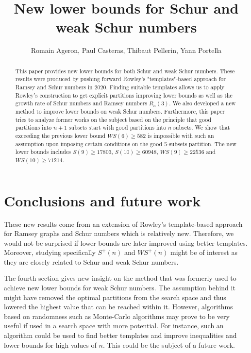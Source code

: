 \documentclass{article}
\title{New lower bounds for Schur and weak Schur numbers}
\author{Romain Ageron, Paul Casteras, Thibaut Pellerin, Yann Portella}
\newtheorem{computational theorem}{Computational Theorem}[section]
\begin{document}
\maketitle

\begin{abstract}

This paper provides new lower bounds for both Schur and weak Schur numbers. These results were produced by pushing forward
Rowley's "templates"-based approach for Ramsey and Schur numbers in 2020. Finding suitable templates allows us to apply Rowley's construction
to get explicit partitions improving lower bounds as well as the growth rate of Schur numbers and Ramsey numbers \(R_n(3)\). 
We also developed a new method to improve lower bounds on weak Schur numbers. Furthermore, this paper tries to analyze former 
works on the subject based on the principle that good partitions into \(n+1\) subsets start with good partitions 
into \(n\) subsets. We show that exceeding the previous lower bound \(WS(6) \geqslant 582\) is impossible with such an assumption upon 
imposing certain conditions on the good 5-subsets partition. The new lower bounds includes \(S(9) \geqslant 17803\), \(S(10) \geqslant 60948\), 
\(WS(9) \geqslant 22536 \) and \(WS(10) \geqslant 71214 \).

\end{abstract}










\section{Conclusions and future work}

\par
These new results come from an extension of Rowley's template-based approach for Ramsey graphs and Schur numbers which is relatively new. 
Therefore, we would not be surprised if lower bounds are later improved using better templates. Moreover, studying specifically \(S^+(n)\) and 
\(WS^+(n)\) might be of interest as they are closely related to Schur and weak Schur numbers.

\par
The fourth section gives new insight on the method that was formerly used to achieve new lower bounds for weak Schur numbers. The assumption behind it
might have removed the optimal partitions from the search space and thus lowered the highest value that can be reached within it.
However, algorithms based on randomness such as Monte-Carlo algorithms may prove to be very useful if used in a search space with more
potential. For instance, such an algorithm could be used to find better templates and improve inequalities and lower bounds for high values
of \(n\). This could be the subject of a future work.
\end{document}

